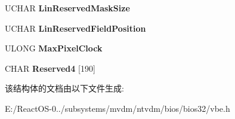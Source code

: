 \begin{DoxyCompactItemize}
U\+C\+H\+AR {\bfseries Lin\+Reserved\+Mask\+Size}
\item 
\mbox{\label{struct___v_b_e___m_o_d_e___i_n_f_o_a72924b936ad8ee1c2d54f2d853ad4543}} 
U\+C\+H\+AR {\bfseries Lin\+Reserved\+Field\+Position}
\item 
\mbox{\label{struct___v_b_e___m_o_d_e___i_n_f_o_a89d3ea9bd5ad994d6c2f7a56ab9cce45}} 
U\+L\+O\+NG {\bfseries Max\+Pixel\+Clock}
\item 
\mbox{\label{struct___v_b_e___m_o_d_e___i_n_f_o_a1b1afdedc87597c25af9341e4bf76b08}} 
C\+H\+AR {\bfseries Reserved4} \mbox{[}190\mbox{]}
\end{DoxyCompactItemize}


该结构体的文档由以下文件生成\+:\begin{DoxyCompactItemize}
\item 
E\+:/\+React\+O\+S-\/0../subsystems/mvdm/ntvdm/bios/bios32/vbe.\+h\end{DoxyCompactItemize}
